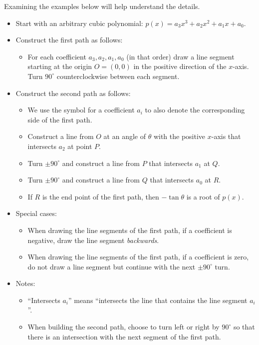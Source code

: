 Examining the examples below will help understand the details.
\begin{itemize}
\item Start with an arbitrary cubic polynomial: $p(x)=a_3x^3+a_2x^2+a_1x+a_0$.
\item Construct the first path as follows:
\begin{itemize}
\item For each coefficient $a_3,a_2,a_1,a_0$ (in that order) draw a line segment starting at the origin $O=(0,0)$ in the positive direction of the $x$-axis. Turn $90^\circ$ counterclockwise between each segment.
\end{itemize}
\item Construct the second path as follows:
\begin{itemize}
\item We use the symbol for a coefficient $a_i$ to also denote the corresponding side of the first path.
\item Construct a line from $O$ at an angle of $\theta$ with the positive $x$-axis that intersects $a_2$ at point $P$.
\item Turn $\pm 90^\circ$ and construct a line from $P$ that intersects $a_1$ at $Q$.
\item Turn $\pm 90^\circ$ and construct a line from $Q$ that intersects $a_0$ at $R$.
\item If $R$ is the end point of the first path, then $-\tan\theta$ is a root of $p(x)$.
\end{itemize}
\item Special cases:
\begin{itemize}
\item When drawing the line segments of the first path, if a coefficient is negative, draw the line segment \emph{backwards}.
\item When drawing the line segments of the first path, if a coefficient is zero, do not draw a line segment but continue with the next $\pm 90^\circ$ turn.
\end{itemize}
\item Notes:
\begin{itemize}
\item ``Intersects $a_i$'' means ``intersects the line that contains the line segment $a_i$''.
\item When building the second path, choose to turn left or right by $90^\circ$ so that there is an intersection with the next segment of the first path.
\end{itemize}
\end{itemize}

